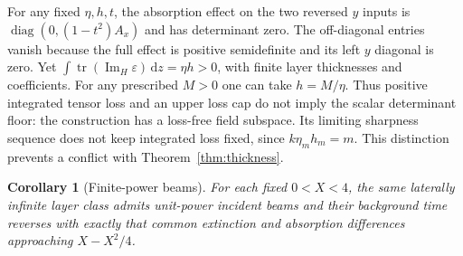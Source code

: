 \documentclass[11pt,a4paper]{article}
\newtheorem{corollary}[theorem]{Corollary}
\theoremstyle{remark}
\newcommand{\dd}{\,\mathrm d}
\newcommand{\tr}{\operatorname{tr}}
\newcommand{\diag}{\operatorname{diag}}
\newcommand{\ImH}{\operatorname{Im}_{H}}
\begin{document}
For any fixed $\eta,h,t$, the absorption effect on the two reversed $y$ inputs is $\diag(0,(1-t^2)A_x)$ and has determinant zero. The off-diagonal entries vanish because the full effect is positive semidefinite and its left $y$ diagonal is zero. Yet $\int\tr(\ImH\varepsilon)\dd z=\eta h>0$, with finite layer thicknesses and coefficients. For any prescribed $M>0$ one can take $h=M/\eta$. Thus positive integrated tensor loss and an upper loss cap do not imply the scalar determinant floor: the construction has a loss-free field subspace. Its limiting sharpness sequence does not keep integrated loss fixed, since $k\eta_mh_m=m$. This distinction prevents a conflict with Theorem~\ref{thm:thickness}.

\begin{corollary}[Finite-power beams]\label{cor:beams}
For each fixed $0<X<4$, the same laterally infinite layer class admits unit-power incident beams and their background time reverses with exactly that common extinction and absorption differences approaching $X-X^2/4$.
\end{corollary}
\end{document}
